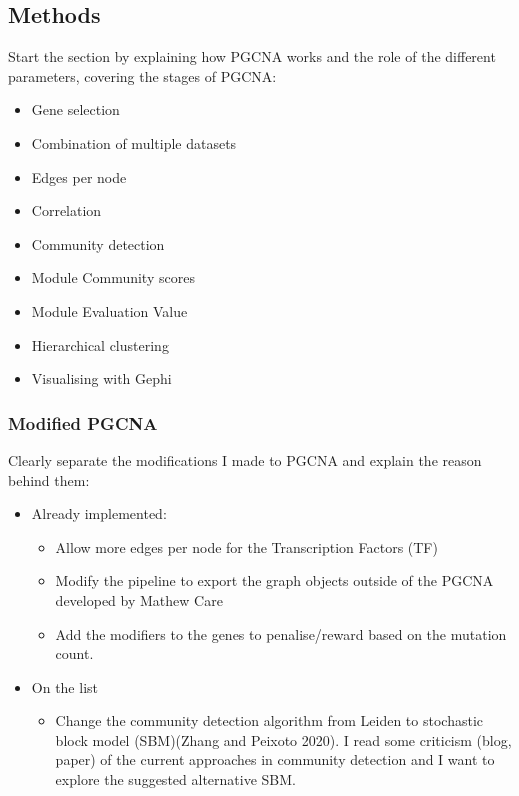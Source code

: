 \subsection{Methods} 


Start the section by explaining how PGCNA works and the role of the different parameters, covering the stages of PGCNA:
\begin{itemize}
    \item Gene selection
    \item Combination of multiple datasets
    \item Edges per node
    \item Correlation
    \item Community detection
    \item Module Community scores
    \item Module Evaluation Value
    \item Hierarchical clustering
    \item Visualising with Gephi
\end{itemize}

\subsubsection{Modified PGCNA}

Clearly separate the modifications I made to PGCNA and explain the reason behind them:

\begin{itemize}
    \item Already implemented:
          \begin{itemize}
              \item Allow more edges per node for the Transcription Factors (TF)
              \item Modify the pipeline to export the graph objects outside of the PGCNA developed by Mathew Care
              \item Add the modifiers to the genes to penalise/reward based on the mutation count.
          \end{itemize}
    \item On the list
          \begin{itemize}
              \item Change the community detection algorithm from Leiden to stochastic block model (SBM)(Zhang and Peixoto 2020). I read some criticism (blog, paper) of the current approaches in community detection and I want to explore the suggested alternative SBM.
          \end{itemize}
\end{itemize}


